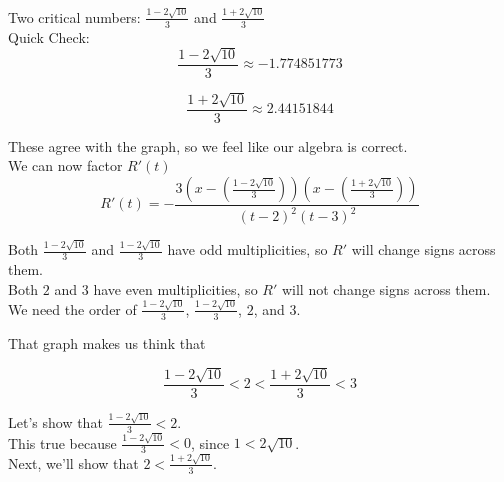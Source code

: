 \documentclass{ximera}
\begin{document}
\begin{example}
Two critical numbers: $\frac{1 - 2 \sqrt{10}}{3}$ and $\frac{1 + 2 \sqrt{10}}{3}$ \\




Quick Check:  \\


\[
\frac{1 - 2 \sqrt{10}}{3} \approx -1.774851773
\]


\[
\frac{1 + 2 \sqrt{10}}{3} \approx 2.44151844
\]


These agree with the graph, so we feel like our algebra is correct. \\



We can now factor $R'(t)$ \\








\[   
R'(t) = -\frac{3 \left(x - \left(\frac{1 - 2 \sqrt{10}}{3} \right) \right) \left(x - \left(\frac{1 + 2 \sqrt{10}}{3} \right) \right) }{ (t-2)^2 (t-3)^2 } 
\]


Both $\frac{1 - 2 \sqrt{10}}{3}$ and $\frac{1 - 2 \sqrt{10}}{3}$ have odd multiplicities, so $R'$ will change signs across them. \\




Both $2$ and $3$ have even multiplicities, so $R'$ will not change signs across them. \\



We need the order of $\frac{1 - 2 \sqrt{10}}{3}$, $\frac{1 - 2 \sqrt{10}}{3}$, $2$, and $3$.   \\



\begin{explanation}

That graph makes us think that 

\[
\frac{1 - 2 \sqrt{10}}{3} < 2 < \frac{1 + 2 \sqrt{10}}{3} < 3
\]


Let's show that $\frac{1 - 2 \sqrt{10}}{3} < 2$. \\

This true because $\frac{1 - 2 \sqrt{10}}{3} < 0$, since $1 < 2 \sqrt{10}$. \\



Next, we'll show that $2 < \frac{1 + 2 \sqrt{10}}{3}$. \\




\end{explanation}
\end{example}
\end{document}
